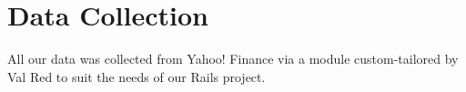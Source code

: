 \chapter{Data Collection}
All our data was collected from Yahoo! Finance via a module custom-tailored by Val Red to suit the needs of our Rails project. 